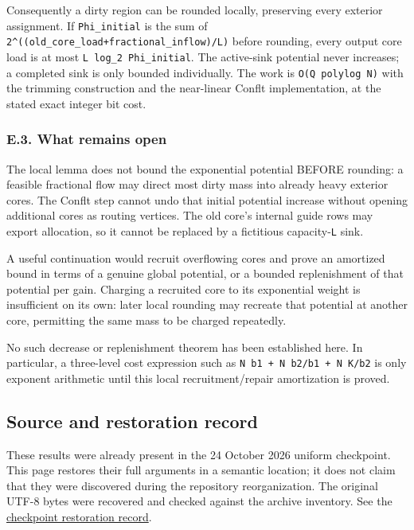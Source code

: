 Consequently a dirty region can be rounded locally, preserving every exterior assignment. If \texttt{Phi\_initial} is the sum of \texttt{2\^{}((old\_core\_load+fractional\_inflow)/L)} before rounding, every output core load is at most \texttt{L\ log\_2\ Phi\_initial}. The active-sink potential never increases; a completed sink is only bounded individually. The work is \texttt{O(\textbar{}Q\textbar{}\ polylog\ N)} with the trimming construction and the near-linear Conflt implementation, at the stated exact integer bit cost.

\hypertarget{af-385fd70686-e.3.-what-remains-open}{%
\subsubsection{E.3. What remains open}\label{af-385fd70686-e.3.-what-remains-open}}

The local lemma does not bound the exponential potential BEFORE rounding: a feasible fractional flow may direct most dirty mass into already heavy exterior cores. The Conflt step cannot undo that initial potential increase without opening additional cores as routing vertices. The old core's internal guide rows may export allocation, so it cannot be replaced by a fictitious capacity-\texttt{L} sink.

A useful continuation would recruit overflowing cores and prove an amortized bound in terms of a genuine global potential, or a bounded replenishment of that potential per gain. Charging a recruited core to its exponential weight is insufficient on its own: later local rounding may recreate that potential at another core, permitting the same mass to be charged repeatedly.

No such decrease or replenishment theorem has been established here. In particular, a three-level cost expression such as \texttt{N\ b1\ +\ N\ b2/b1\ +\ N\ K/b2} is only exponent arithmetic until this local recruitment/repair amortization is proved.

\hypertarget{af-385fd70686-source-and-restoration-record}{%
\subsection{Source and restoration record}\label{af-385fd70686-source-and-restoration-record}}

These results were already present in the 24 October 2026 uniform checkpoint. This page restores their full arguments in a semantic location; it does not claim that they were discovered during the repository reorganization. The original UTF-8 bytes were recovered and checked against the archive inventory. See the \href{https://github.com/icekylinx/algorithm-frontier/blob/main/provenance/checkpoint-restoration.md}{checkpoint restoration record}.

